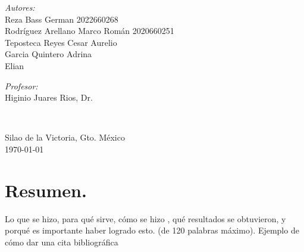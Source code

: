 \documentclass[10pt]{article}
\begin{document}
\begin{center}
\begin{minipage}{0.46\textwidth}
\begin{flushleft}
\emph{Autores:}\\	
Reza Bass German 2022660268\\
Rodríguez Arellano Marco Román 2020660251\\
Teposteca Reyes Cesar Aurelio \\ 
Garcia Quintero Adrina \\
Elian
\end{flushleft}																		%
\end{minipage}		
\begin{minipage}{0.52\textwidth}		
\vspace{-0.6cm}											%
\begin{flushright} \large															%
\emph{Profesor:} \\																	%
Higinio Juares Rios, Dr.\\											%
\end{flushright}																	%
\end{minipage}	
\vspace*{1cm}
 	
 		\\																		%
\vspace{2cm} 																				
\begin{center}	
Silao de la Victoria, Gto. México \\
{\large \today}																	%
 			\end{center}												  						
\end{center}							 											
																					
\newpage																		

\tableofcontents 

\newpage

\section{Resumen.}



 Lo que se hizo, para qué sirve, cómo se hizo , qué resultados se obtuvieron, y porqué es importante haber logrado esto.  (de 120 palabras máximo).
 Ejemplo de cómo dar una cita bibliográfica \cite{IEEEreferencias:Ref1} 
\end{document}
